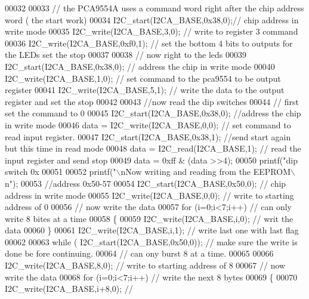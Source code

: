 \begin{DoxyCode}
00032  
00033  \textcolor{comment}{// the PCA9554A   uses a command word right after the chip address word ( the start work)}
00034  I2C_start(I2CA\_BASE,0x38,0);\textcolor{comment}{// chip address in write mode}
00035  I2C_write(I2CA\_BASE,3,0);  \textcolor{comment}{// write to register 3 command}
00036  I2C_write(I2CA\_BASE,0xf0,1);  \textcolor{comment}{// set the bottom 4 bits to outputs for the LEDs set the stop}
00037  
00038  \textcolor{comment}{// now right to the leds}
00039   I2C_start(I2CA\_BASE,0x38,0); \textcolor{comment}{// address the chip in write mode}
00040  I2C_write(I2CA\_BASE,1,0);  \textcolor{comment}{// set command to the pca9554 to be output register}
00041  I2C_write(I2CA\_BASE,5,1);  \textcolor{comment}{// write the data to the output register and set the stop}
00042 
00043 \textcolor{comment}{//now read the dip switches}
00044 \textcolor{comment}{// first set the command to 0}
00045  I2C_start(I2CA\_BASE,0x38,0); \textcolor{comment}{//address the chip in write mode}
00046 data =  I2C_write(I2CA\_BASE,0,0);  \textcolor{comment}{// set command to read input register.}
00047  I2C_start(I2CA\_BASE,0x38,1); \textcolor{comment}{//send start again but this time in read mode}
00048 data =  I2C_read(I2CA\_BASE,1);  \textcolor{comment}{// read the input register and send stop}
00049 data = 0xff & (data >>4);   
00050 printf(\textcolor{stringliteral}{"dip switch 0x%
00051 
00052 printf(\textcolor{stringliteral}{"\(\backslash\)nNow writing and reading from the EEPROM\(\backslash\)n"});
00053 \textcolor{comment}{//address 0x50-57}
00054 I2C_start(I2CA\_BASE,0x50,0); \textcolor{comment}{// chip address in write mode}
00055 I2C_write(I2CA\_BASE,0,0);  \textcolor{comment}{// write to starting address of 0}
00056 \textcolor{comment}{// now write the data }
00057 \textcolor{keywordflow}{for} (i=0;i<7;i++)           \textcolor{comment}{// can only write 8 bites at a time}
00058 \{   
00059  I2C_write(I2CA\_BASE,i,0);  \textcolor{comment}{// writ the data }
00060 \}
00061  I2C_write(I2CA\_BASE,i,1);  \textcolor{comment}{// write last one with last flag}
00062  
00063  \textcolor{keywordflow}{while} ( I2C_start(I2CA\_BASE,0x50,0)); \textcolor{comment}{// make sure the write is done be fore continuing.}
00064  \textcolor{comment}{// can ony burst 8 at a time.}
00065 
00066 I2C_write(I2CA\_BASE,8,0);  \textcolor{comment}{// write to starting address of 8}
00067 \textcolor{comment}{// now write the data }
00068 \textcolor{keywordflow}{for} (i=0;i<7;i++)   \textcolor{comment}{// write the next 8 bytes}
00069 \{
00070  I2C_write(I2CA\_BASE,i+8,0);  \textcolor{comment}{// }
}
\end{DoxyCode}
